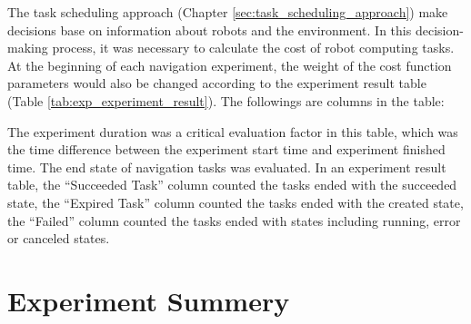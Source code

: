 The task scheduling approach (Chapter \ref{sec:task_scheduling_approach}) make decisions base on information about robots and the environment. In this decision-making process, it was necessary to calculate the cost of robot computing tasks. At the beginning of each navigation experiment, the weight of the cost function parameters would also be changed according to the experiment result table (Table \ref{tab:exp_experiment_result}). The followings are columns in the table:

The experiment duration was a critical evaluation factor in this table, which was the time difference between the experiment start time and experiment finished time. The end state of navigation tasks was evaluated. In an experiment result table, the ``Succeeded Task'' column counted the tasks ended with the succeeded state, the ``Expired Task'' column counted the tasks ended with the created state, the ``Failed'' column counted the tasks ended with states including running, error or canceled states. 

\begin{table}
\centering
{}
\caption{Example result of navigation experiment. The values of the first four columns (weight parameters) were set before the simulation experiment was started, and the values of other columns were filled after the simulation experiment.}
\label{tab:exp_experiment_result}
\end{table}

\section{Experiment Summery}




